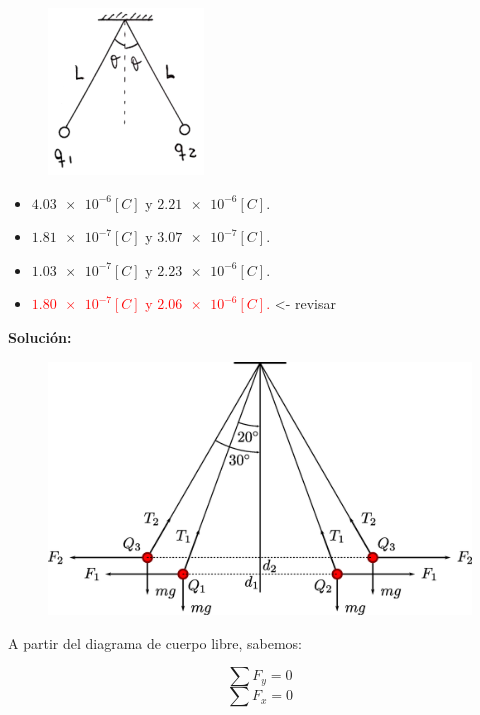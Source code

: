 \documentclass[letter,11pt]{article}
\begin{document}
\begin{enumerate}
\begin{figure}[!h]
\centering
\includegraphics[scale=1.84]{resources/q3.eps}
\end{figure}

\begin{itemize}
    \item $\num{4.03e-6}[C]$ y $\num{2.21e-6}[C]$.
    \item $\num{1.81e-7}[C]$ y $\num{3.07e-7}[C]$.
    \item $\num{1.03e-7}[C]$ y $\num{2.23e-6}[C]$.
    \item \textcolor{red}{$\num{1.80e-7}[C]$ y $\num{2.06e-6}[C]$.} <- revisar
\end{itemize}

\textbf{Solución:}

\begin{figure}[!h]
\centering
\includegraphics[scale=0.38]{resources/a3.eps}
\end{figure}

A partir del diagrama de cuerpo libre, sabemos:

\begin{equation*}
    \sum F_y = 0
\end{equation*}
\begin{equation*}
    \sum F_x = 0
\end{equation*}


\end{enumerate}
\end{document}
